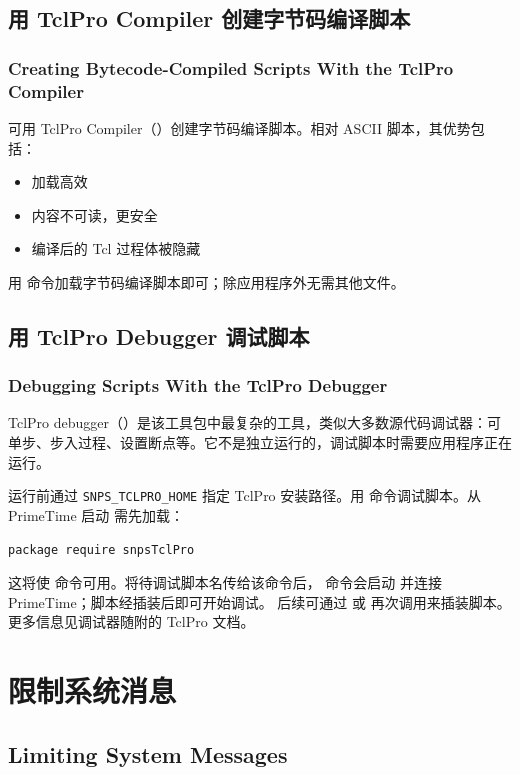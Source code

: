 \subsection{用 TclPro Compiler 创建字节码编译脚本}
\subsubsection*{Creating Bytecode-Compiled Scripts With the TclPro Compiler}

可用 TclPro Compiler（）创建字节码编译脚本。相对 ASCII 脚本，其优势包括：
\begin{itemize}
  \item 加载高效
  \item 内容不可读，更安全
  \item 编译后的 Tcl 过程体被隐藏
\end{itemize}

用  命令加载字节码编译脚本即可；除应用程序外无需其他文件。

\subsection{用 TclPro Debugger 调试脚本}
\subsubsection*{Debugging Scripts With the TclPro Debugger}

TclPro debugger（）是该工具包中最复杂的工具，类似大多数源代码调试器：可单步、步入过程、设置断点等。它不是独立运行的，调试脚本时需要应用程序正在运行。

运行前通过 \texttt{SNPS\_TCLPRO\_HOME} 指定 TclPro 安装路径。用  命令调试脚本。从 PrimeTime 启动  需先加载：
\begin{lstlisting}
package require snpsTclPro
\end{lstlisting}
这将使  命令可用。将待调试脚本名传给该命令后，
命令会启动  并连接 PrimeTime；脚本经插装后即可开始调试。
后续可通过  或  再次调用来插装脚本。
更多信息见调试器随附的 TclPro 文档。

\section{限制系统消息}
\subsection*{Limiting System Messages}

